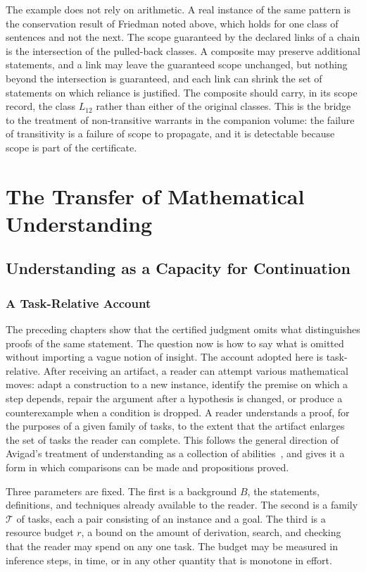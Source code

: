 \documentclass[11pt]{book}
\theoremstyle{definition}
\theoremstyle{remark}
\begin{document}
The example does not rely on arithmetic. A real instance of the same pattern is the conservation result of Friedman noted above, which holds for one class of sentences and not the next. The scope guaranteed by the declared links of a chain is the intersection of the pulled-back classes. A composite may preserve additional statements, and a link may leave the guaranteed scope unchanged, but nothing beyond the intersection is guaranteed, and each link can shrink the set of statements on which reliance is justified. The composite should carry, in its scope record, the class $L_{12}$ rather than either of the original classes. This is the bridge to the treatment of non-transitive warrants in the companion volume: the failure of transitivity is a failure of scope to propagate, and it is detectable because scope is part of the certificate.

\part{The Transfer of Mathematical Understanding}

\chapter{Understanding as a Capacity for Continuation}

\section{A Task-Relative Account}

The preceding chapters show that the certified judgment omits what distinguishes proofs of the same statement. The question now is how to say what is omitted without importing a vague notion of insight. The account adopted here is task-relative. After receiving an artifact, a reader can attempt various mathematical moves: adapt a construction to a new instance, identify the premise on which a step depends, repair the argument after a hypothesis is changed, or produce a counterexample when a condition is dropped. A reader understands a proof, for the purposes of a given family of tasks, to the extent that the artifact enlarges the set of tasks the reader can complete. This follows the general direction of Avigad's treatment of understanding as a collection of abilities~\cite{avigad}, and gives it a form in which comparisons can be made and propositions proved.

Three parameters are fixed. The first is a background $B$, the statements, definitions, and techniques already available to the reader. The second is a family $\mathcal T$ of tasks, each a pair consisting of an instance and a goal. The third is a resource budget $r$, a bound on the amount of derivation, search, and checking that the reader may spend on any one task. The budget may be measured in inference steps, in time, or in any other quantity that is monotone in effort.
\end{document}
